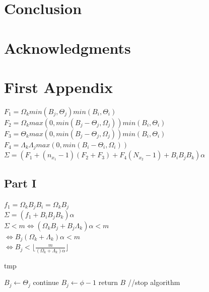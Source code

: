 \documentclass[conference]{IEEEtran}
\begin{document}
\section*{Conclusion}

\section*{Acknowledgments}




\appendices

  \section{First Appendix}
  \label{FirstAppendix}

  \noindent $F_1 = \Omega_k min(B_j, \Theta_j) min(B_i, \Theta_i)$ \\
  $F_2 = \Omega_k max(0, min(B_j - \Theta_j, \Omega_j)) min(B_i, \Theta_i)$ \\
  $F_3 = \Theta_k max(0, min(B_j - \Theta_j, \Omega_j)) min(B_i, \Theta_i)$ \\
  $F_4 = \Lambda_k \Lambda_j max(0, min(B_i - \Theta_i, \Omega_i))$ \\
  $\Sigma = (F_1 + (n_{x_1}-1)(F_2 + F_3) + F_4(N_{x_2}-1) + B_iB_jB_k)\alpha$

  \subsection{Part I}
  \noindent $f_1 = \Omega_k B_j B_i = \Omega_k B_j$ \\
  $\Sigma = (f_1 + B_iB_jB_k)\alpha$ \\
  $\Sigma < m \Leftrightarrow (\Omega_k B_j + B_j \Lambda_k)\alpha < m$ \\
  $\Leftrightarrow B_j (\Omega_k + \Lambda_k) \alpha < m $ \\
  $\Leftrightarrow B_j < \lfloor \frac{m}{(\Omega_k + \Lambda_k)\alpha} \rfloor$

  \begin{algorithm}[h]
    \caption{tmp}
    \begin{algorithmic}[1]
      \STATE $B_j \leftarrow \Theta_j$
      \STATE continue
    \ELSE
      \STATE $B_j \leftarrow \phi - 1$
      \STATE return $B$ //stop algorithm
    \ENDIF
    \end{algorithmic}
  \end{algorithm}
\end{document}
